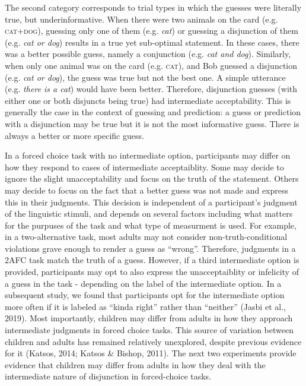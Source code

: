 \documentclass[,man,floatsintext]{apa6}
\begin{document}
The second category corresponds to trial types in which the guesses were literally true, but underinformative. When there were two animals on the card (e.g. \textsc{cat+dog}), guessing only one of them (e.g. \emph{cat}) or guessing a disjunction of them (e.g. \emph{cat or dog}) results in a true yet sub-optimal statement. In these cases, there was a better possible guess, namely a conjunction (e.g. \emph{cat and dog}). Similarly, when only one animal was on the card (e.g. \textsc{cat}), and Bob guessed a disjunction (e.g. \emph{cat or dog}), the guess was true but not the best one. A simple utterance (e.g. \emph{there is a cat}) would have been better. Therefore, disjunction guesses (with either one or both disjuncts being true) had intermediate acceptability. This is generally the case in the context of guessing and prediction: a guess or prediction with a disjunction may be true but it is not the most informative guess. There is always a better or more specific guess.

In a forced choice task with no intermediate option, participants may differ on how they respond to cases of intermediate acceptaiblity. Some may decide to ignore the slight unacceptability and focus on the truth of the statement. Others may decide to focus on the fact that a better guess was not made and express this in their judgments. This decision is independent of a participant's judgment of the linguistic stimuli, and depends on several factors including what matters for the purpuses of the task and what type of measurment is used. For example, in a two-alternative task, most adults may not consider non-truth-conditional violations grave enough to render a guess as \enquote{wrong}. Therefore, judgments in a 2AFC task match the truth of a guess. However, if a third intermediate option is provided, participants may opt to also express the unacceptaiblity or infelicity of a guess in the task - depending on the label of the intermediate option. In a subsequent study, we found that participants opt for the intermediate option more often if it is labeled as \enquote{kinda right} rather than \enquote{neither} (Jasbi et al., 2019). Most importantly, children may differ from adults in how they approach intermediate judgments in forced choice tasks. This source of variation between children and adults has remained relatively unexplored, despite previous evidence for it (Katsos, 2014; Katsos \& Bishop, 2011). The next two experiments provide evidence that children may differ from adults in how they deal with the intermediate nature of disjunction in forced-choice tasks.
\end{document}
